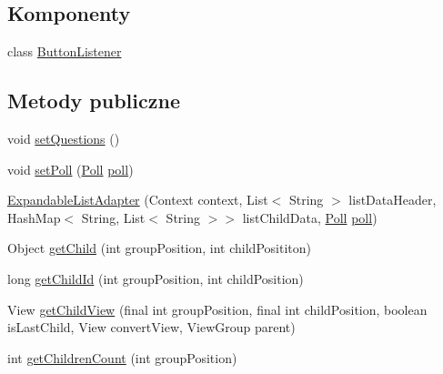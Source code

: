 \subsection*{Komponenty}
\begin{DoxyCompactItemize}
\item 
class \hyperlink{classcom_1_1example_1_1qrpoll_1_1_expandable_list_adapter_1_1_button_listener}{Button\+Listener}
\end{DoxyCompactItemize}
\subsection*{Metody publiczne}
\begin{DoxyCompactItemize}
\item 
void \hyperlink{classcom_1_1example_1_1qrpoll_1_1_expandable_list_adapter_a8124339d7fc7169df890068e07c76e41}{set\+Questions} ()
\item 
void \hyperlink{classcom_1_1example_1_1qrpoll_1_1_expandable_list_adapter_a76c2b3720ad077a33ac32cb371aea902}{set\+Poll} (\hyperlink{classcom_1_1example_1_1qrpoll_1_1_poll}{Poll} \hyperlink{classcom_1_1example_1_1qrpoll_1_1_expandable_list_adapter_a35f2a91149fc7265646cd916c54a02ef}{poll})
\item 
\hyperlink{classcom_1_1example_1_1qrpoll_1_1_expandable_list_adapter_af5cff710db9f2515f997f24bb1b2d816}{Expandable\+List\+Adapter} (Context context, List$<$ String $>$ list\+Data\+Header, Hash\+Map$<$ String, List$<$ String $>$$>$ list\+Child\+Data, \hyperlink{classcom_1_1example_1_1qrpoll_1_1_poll}{Poll} \hyperlink{classcom_1_1example_1_1qrpoll_1_1_expandable_list_adapter_a35f2a91149fc7265646cd916c54a02ef}{poll})
\item 
Object \hyperlink{classcom_1_1example_1_1qrpoll_1_1_expandable_list_adapter_a85fb08a976c8961e0f3e9fed7eae064e}{get\+Child} (int group\+Position, int child\+Posititon)
\item 
long \hyperlink{classcom_1_1example_1_1qrpoll_1_1_expandable_list_adapter_a34e4958bd1ff0cc578cb8c65b26d4d4b}{get\+Child\+Id} (int group\+Position, int child\+Position)
\item 
View \hyperlink{classcom_1_1example_1_1qrpoll_1_1_expandable_list_adapter_a4d933f905a39d145b9e400693dc90193}{get\+Child\+View} (final int group\+Position, final int child\+Position, boolean is\+Last\+Child, View convert\+View, View\+Group parent)
\item 
int \hyperlink{classcom_1_1example_1_1qrpoll_1_1_expandable_list_adapter_abd5d4f934326b8ec5ea92580d81e5616}{get\+Children\+Count} (int group\+Position)
$$
\end{DoxyCompactItemize}
